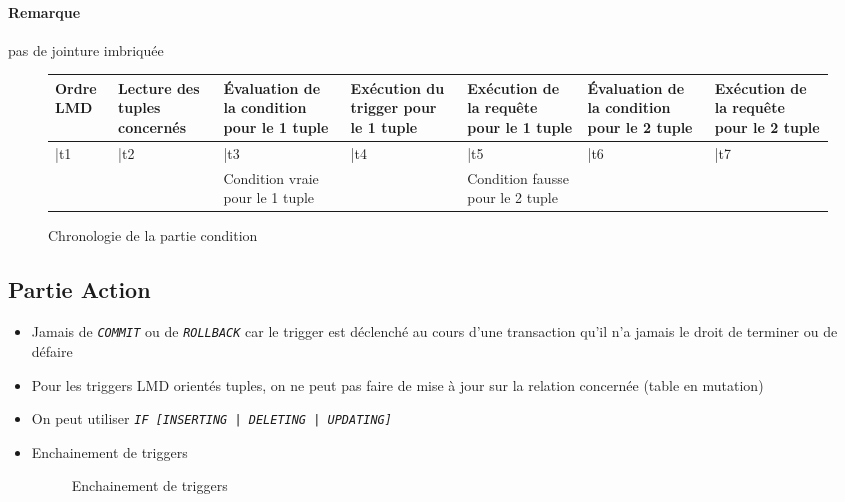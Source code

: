 \documentclass[10pt]{article}
\begin{document}
                \paragraph{Remarque} pas de jointure imbriquée
                \begin{figure}[H]
                    \begin{tabular}{*{7}{p{2cm}}}
                        Ordre LMD & Lecture des tuples concernés & Évaluation de la condition pour le 1\up{er} tuple & Exécution du trigger pour le 1\up{er} tuple & Exécution de la requête pour le 1\up{er} tuple & Évaluation de la condition pour le 2\up{ème} tuple & Exécution de la requête pour le 2\up{ème} tuple \\
                       \hline
                        |t1 & |t2 & |t3 & |t4 & |t5 & |t6 & |t7\\
                        && Condition vraie pour le 1\up{er} tuple && Condition fausse pour le 2\up{ème} tuple
                    \end{tabular}
                    \caption{Chronologie de la partie condition}
                \end{figure}

            \subsection{Partie Action}
                \begin{itemize}
                    \item Jamais de \emph{\texttt{COMMIT}} ou de \emph{\texttt{ROLLBACK}} car le trigger est déclenché au cours d'une transaction qu'il n'a jamais le droit de terminer ou de défaire
                    \item Pour les triggers LMD orientés tuples, on ne peut pas faire de mise à jour sur la relation concernée (table en mutation)
                    \item On peut utiliser \emph{\texttt{IF [INSERTING | DELETING | UPDATING]}}
                    \item Enchainement de triggers

                    \begin{figure}[H]
                        \begin{center}
                        \end{center}
                        \caption{Enchainement de triggers}
                    \end{figure}
                \end{itemize}
\end{document}
